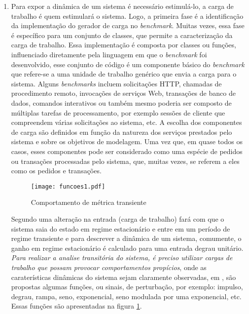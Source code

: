 \begin{enumerate}
	\item Para expor a dinâmica de um sistema é necessário estimulá-lo, a carga de trabalho é quem estimulará o sistema. Logo, a primeira fase é a identificação da implementação do gerador de carga no \textit{benchmark}. Muitas vezes, essa fase é específico para um conjunto de classes, que permite a caracterização da carga de trabalho. 
	Essa implementação é composta por classes ou funções, influenciado diretamente pela linguagem em que o \textit{benchmark} foi desenvolvido, esse conjunto de código é um componente básico do \textit{benchmark} que refere-se a uma unidade de trabalho genérico que envia a carga para o sistema. Alguns \textit{benchmarks} incluem solicitações HTTP, chamadas de procedimento remoto, invocações de serviços Web, transações de banco de dados, comandos interativos ou também mesmo poderia ser composto de múltiplas tarefas de processamento, por exemplo sessões de cliente que compreendem várias solicitações ao sistema, etc.\cite{Kounev2005}
	A escolha dos componentes de carga são definidos em função da natureza dos serviços prestados pelo sistema e sobre os objetivos de modelagem. Uma vez que, em quase todos os casos, esses componentes pode ser considerado como uma espécie de pedidos ou transações processadas pelo sistema, que, muitas vezes, se referem a eles como os pedidos e transações.\cite{Kounev2005}
		
	\begin{figure}[htb]
		\caption{Comportamento de métrica transiente}
		\label{fig:funcoes1}
		\centering
		\texttt{[image: funcoes1.pdf]}
	\end{figure}
	
	
	Segundo \cite{Nobile2013} uma alteração na entrada (carga de trabalho) fará com que o sistema saia do estado em regime estacionário e entre em um período de regime transiente e para descrever a dinâmica de um sistema, comumente, o ganho em regime estacionário é calculado para uma entrada degrau unitário. \textit{Para realizar a analise transitória do sistema, é preciso utilizar cargas de trabalho que possam provocar comportamentos propícios}, onde as caraterísticas dinâmicas do sistema sejam claramente observadas, em \cite{Hellerstein2004}, são propostas algumas funções, ou sinais, de perturbação, por exemplo: impulso, degrau, rampa, seno, exponencial, seno modulada por uma exponencial, etc.  Essas funções são apresentadas na figura \ref{fig:funcoes1}.%
	

\end{enumerate}
